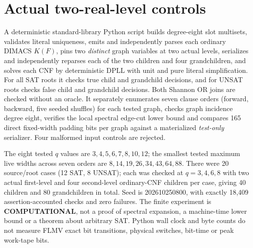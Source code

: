 \documentclass[11pt]{article}
\begin{document}
\section*{Actual two-real-level controls}
A deterministic standard-library Python script builds degree-eight slot multisets, validates literal uniqueness, emits and independently parses each ordinary DIMACS $K(F)$, pins two \emph{distinct} graph variables at two actual levels, serializes and independently reparses each of the two children and four grandchildren, and solves each CNF by deterministic DPLL with unit and pure literal simplification. For all SAT roots it checks true child and grandchild decisions, and for UNSAT roots checks false child and grandchild decisions. Both Shannon OR joins are checked without an oracle. It separately enumerates seven clause orders (forward, backward, five seeded shuffles) for each tested graph, checks graph incidence degree eight, verifies the local spectral edge-cut lower bound and compares 165 direct fixed-width padding bits per graph against a materialized \emph{test-only} serializer. Four malformed input controls are rejected.

The eight tested $q$ values are $3,4,5,6,7,8,10,12$; the smallest tested maximum live widths across seven orders are $8,14,19,26,34,43,64,88$. There were 20 source/root cases (12 SAT, 8 UNSAT); each was checked at $q=3,4,6,8$ with two actual first-level and four second-level ordinary-CNF children per case, giving 40 children and 80 grandchildren in total. Seed is 202610250800, with exactly 18,409 assertion-accounted checks and zero failures. The finite experiment is \textbf{COMPUTATIONAL}, not a proof of spectral expansion, a machine-time lower bound or a theorem about arbitrary SAT. Python wall clock and byte counts do not measure FLMV exact bit transitions, physical switches, bit-time or peak work-tape bits.
\end{document}
